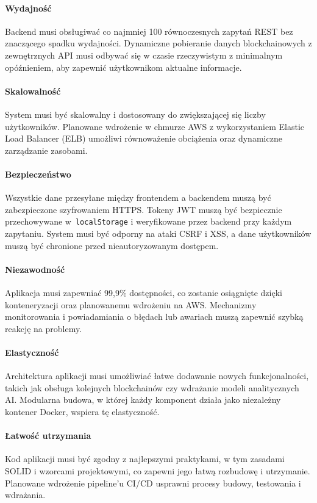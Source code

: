 \paragraph{Wydajność}
Backend musi obsługiwać co najmniej 100 równoczesnych zapytań REST bez znaczącego spadku wydajności. Dynamiczne pobieranie danych blockchainowych z zewnętrznych API musi odbywać się w czasie rzeczywistym z minimalnym opóźnieniem, aby zapewnić użytkownikom aktualne informacje.

\paragraph{Skalowalność}
System musi być skalowalny i dostosowany do zwiększającej się liczby użytkowników. Planowane wdrożenie w chmurze AWS z wykorzystaniem Elastic Load Balancer (ELB) umożliwi równoważenie obciążenia oraz dynamiczne zarządzanie zasobami.

\paragraph{Bezpieczeństwo}
Wszystkie dane przesyłane między frontendem a backendem muszą być zabezpieczone szyfrowaniem HTTPS. Tokeny JWT muszą być bezpiecznie przechowywane w~\texttt{localStorage} i weryfikowane przez backend przy każdym zapytaniu. System musi być odporny na ataki CSRF i XSS, a dane użytkowników muszą być chronione przed nieautoryzowanym dostępem.

\paragraph{Niezawodność}
Aplikacja musi zapewniać 99,9\% dostępności, co zostanie osiągnięte dzięki konteneryzacji oraz planowanemu wdrożeniu na AWS. Mechanizmy monitorowania i powiadamiania o błędach lub awariach muszą zapewnić szybką reakcję na problemy.

\paragraph{Elastyczność}
Architektura aplikacji musi umożliwiać łatwe dodawanie nowych funkcjonalności, takich jak obsługa kolejnych blockchainów czy wdrażanie modeli analitycznych AI. Modularna budowa, w której każdy komponent działa jako niezależny kontener Docker, wspiera tę elastyczność.

\paragraph{Łatwość utrzymania}
Kod aplikacji musi być zgodny z najlepszymi praktykami, w tym zasadami SOLID i wzorcami projektowymi, co zapewni jego łatwą rozbudowę i utrzymanie. Planowane wdrożenie pipeline'u CI/CD usprawni procesy budowy, testowania i wdrażania.

